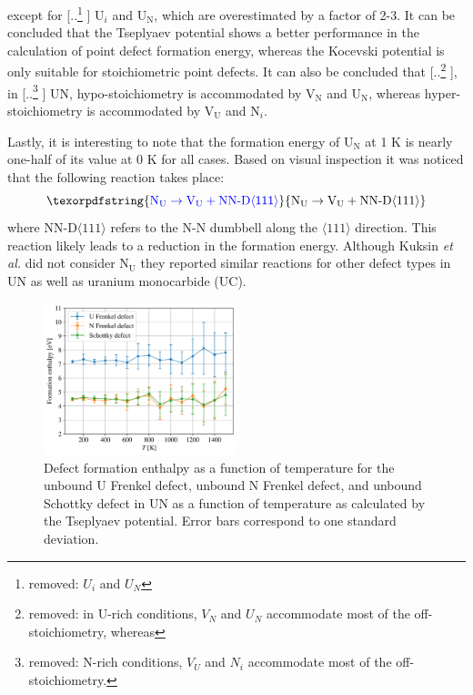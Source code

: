 \documentclass[preprint, 12pt]{elsarticle}
\providecommand{\DIFaddtex}[1]{{\protect\color{blue} \sf #1}} %
\providecommand{\DIFdeltex}[1]{{\protect\color{red} [..\footnote{removed: #1} ]}} %
\providecommand{\DIFaddbegin}{} %
\providecommand{\DIFaddend}{} %
\providecommand{\DIFdelbegin}{} %
\providecommand{\DIFdelend}{} %
\providecommand{\DIFaddFL}[1]{\DIFadd{#1}} %
\providecommand{\DIFaddbeginFL}{} %
\providecommand{\DIFaddendFL}{} %
\providecommand{\DIFadd}[1]{\texorpdfstring{\DIFaddtex{#1}}{#1}} %
\providecommand{\DIFdel}[1]{\texorpdfstring{\DIFdeltex{#1}}{}} %
\newcommand{\DIFscaledelfig}{0.5}
\newlength{\DIFdelgraphicswidth} %
\newlength{\DIFdelgraphicsheight} %
\newcommand{\DIFaddincludegraphics}[2][]{{\color{blue}\fbox{\DIFOincludegraphics[#1]{#2}}}} %
\newcommand{\DIFdelincludegraphics}[2][]{%
\sbox{\DIFdelgraphicsbox}{\DIFOincludegraphics[#1]{#2}}%
\settoboxwidth{\DIFdelgraphicswidth}{\DIFdelgraphicsbox} %
\settoboxtotalheight{\DIFdelgraphicsheight}{\DIFdelgraphicsbox} %
\scalebox{\DIFscaledelfig}{%
\parbox[b]{\DIFdelgraphicswidth}{\usebox{\DIFdelgraphicsbox}\\[-\baselineskip] \rule{\DIFdelgraphicswidth}{0em}}\llap{\resizebox{\DIFdelgraphicswidth}{\DIFdelgraphicsheight}{%
\setlength{\unitlength}{\DIFdelgraphicswidth}%
\begin{picture}(1,1)%
\thicklines\linethickness{2pt} %
{\color[rgb]{1,0,0}\put(0,0){\framebox(1,1){}}}%
{\color[rgb]{1,0,0}\put(0,0){\line( 1,1){1}}}%
{\color[rgb]{1,0,0}\put(0,1){\line(1,-1){1}}}%
\end{picture}%
}\hspace*{3pt}}} %
} %
\DeclareRobustCommand{\DIFaddbegin}{\DIFOaddbegin \let\includegraphics\DIFaddincludegraphics} %
\DeclareRobustCommand{\DIFaddend}{\DIFOaddend \let\includegraphics\DIFOincludegraphics} %
\DeclareRobustCommand{\DIFdelbegin}{\DIFOdelbegin \let\includegraphics\DIFdelincludegraphics} %
\DeclareRobustCommand{\DIFdelend}{\DIFOaddend \let\includegraphics\DIFOincludegraphics} %
\DeclareRobustCommand{\DIFaddbeginFL}{\DIFOaddbeginFL \let\includegraphics\DIFaddincludegraphics} %
\DeclareRobustCommand{\DIFaddendFL}{\DIFOaddendFL \let\includegraphics\DIFOincludegraphics} %
\begin{document}
except for \DIFdelbegin \DIFdel{$U_i$ and $U_N$}\DIFdelend \DIFaddbegin \DIFadd{U$_i$ and U$_\text{N}$}\DIFaddend , which are overestimated by a factor of 2-3. It can be concluded that the Tseplyaev potential shows a better performance in the calculation of point defect formation energy, whereas the Kocevski potential is only suitable for stoichiometric point defects. It can also be concluded that\DIFdelbegin \DIFdel{in U-rich conditions, $V_N$ and $U_N$ accommodate most of the off-stoichiometry, whereas }\DIFdelend , in \DIFdelbegin \DIFdel{N-rich conditions, $V_U$ and $N_i$ accommodate most of the off-stoichiometry. }\DIFdelend \DIFaddbegin \DIFadd{UN, hypo-stoichiometry is accommodated by V$_\text{N}$ and U$_\text{N}$, whereas hyper-stoichiometry is accommodated by V$_\text{U}$ and N$_i$.
}\DIFaddend 

\DIFaddbegin \DIFadd{Lastly, it is interesting to note that the formation energy of U$_\text{N}$ at 1 K is nearly one-half of its value at 0 K for all cases. Based on visual inspection it was noticed that the following reaction takes place:
}\begin{equation}
\DIFadd{\text{N}_\text{U} \rightarrow \text{V}_\text{U} + \text{NN-D} \langle 111 \rangle
}\end{equation}
\DIFadd{where NN-D$\langle 111 \rangle$ refers to the N-N dumbbell along the $\langle 111 \rangle$ direction. This reaction likely leads to a reduction in the formation energy. Although Kuksin \textit{et al.} \cite{Kuksin2016} did not consider N$_\text{U}$ they reported similar reactions for other defect types in UN as well as uranium monocarbide (UC).
}

\DIFaddend \begin{figure}[h!]
    \centering
    \includegraphics[width=0.50\textwidth]{FD-SD-T.png}
    \caption{Defect formation enthalpy as a function of temperature for the \DIFaddbeginFL \DIFaddFL{unbound }\DIFaddendFL U Frenkel defect, \DIFaddbeginFL \DIFaddFL{unbound }\DIFaddendFL N Frenkel defect, and \DIFaddbeginFL \DIFaddFL{unbound }\DIFaddendFL Schottky defect in UN as a function of temperature as calculated by the Tseplyaev potential. Error bars correspond to one standard deviation.}
    \label{Fig:EfvsT}
\end{figure}
\end{document}
